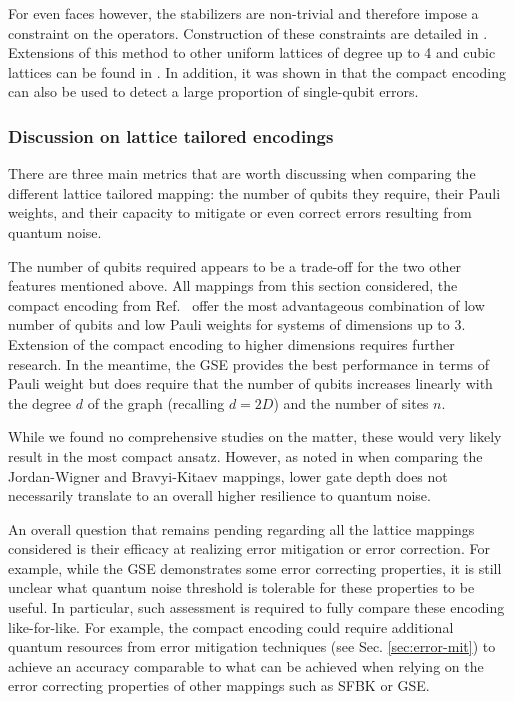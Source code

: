 For even faces however, the stabilizers are non-trivial and therefore impose a constraint on the operators. Construction of these constraints are detailed in \cite{Derby2021, Derby2021_part2}. Extensions of this method to other uniform lattices of degree up to 4 and cubic lattices can be found in \cite{Derby2021_part2}. In addition, it was shown in \cite{Bausch2020} that the compact encoding can also be used to detect a large proportion of single-qubit errors. 

\subsubsection{Discussion on lattice tailored encodings}

There are three main metrics that are worth discussing when comparing the different lattice tailored mapping: the number of qubits they require, their Pauli weights, and their capacity to mitigate or even correct errors resulting from quantum noise. 

The number of qubits required appears to be a trade-off for the two other features mentioned above. All mappings from this section considered, the compact encoding from Ref.~\cite{Derby2021} offer the most advantageous combination of low number of qubits and low Pauli weights for systems of dimensions up to $3$. Extension of the compact encoding to higher dimensions requires further research. In the meantime, the GSE \cite{Setia2019} provides the best performance in terms of Pauli weight but does require that the number of qubits increases linearly with the degree $d$ of the graph (recalling $d = 2D$) and the number of sites $n$.

While we found no comprehensive studies on the matter, these would very likely result in the most compact ansatz. However, as noted in \cite{Sawaya2016} when comparing the Jordan-Wigner and Bravyi-Kitaev mappings, lower gate depth does not necessarily translate to an overall higher resilience to quantum noise.  

An overall question that remains pending regarding all the lattice mappings considered is their efficacy at realizing error mitigation or error correction. For example, while the GSE demonstrates some error correcting properties, it is still unclear what quantum noise threshold is tolerable for these properties to be useful. In particular, such assessment is required to fully compare these encoding like-for-like. For example, the compact encoding could require additional quantum resources from error mitigation techniques (see Sec. \ref{sec:error-mit}) to achieve an accuracy comparable to what can be achieved when relying on the error correcting properties of other mappings such as SFBK or GSE. 

